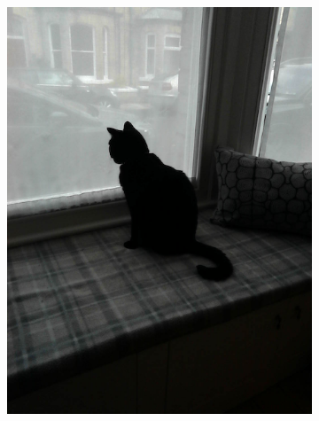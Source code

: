 \documentclass{l4proj}
\begin{document}
\begin{figure}[ht]
  \centering
  \begin{subfigure}[h!]{0.18\textwidth}
    \includegraphics[width=\textwidth, trim={0cm 2.5cm 0cm 2.5cm}, clip]{images/dataset/cat/rgb.png}

\end{subfigure}
\end{figure}
\end{document}
